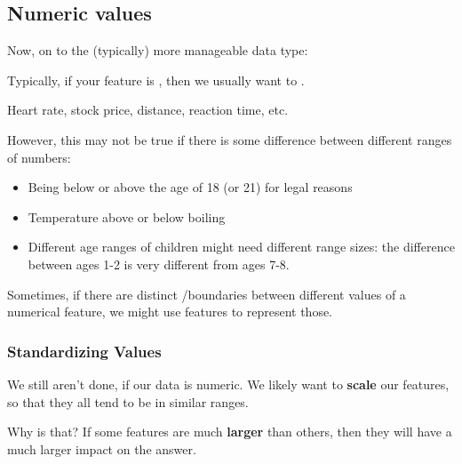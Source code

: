         \subsection*{Numeric values}

            Now, on to the (typically) more manageable data type:\\

            \begin{concept}
                Typically, if your feature is , then we usually want to .
            \end{concept}

            \miniex Heart rate, stock price, distance, reaction time, etc.

            However, this may not be true if there is some difference between different ranges of numbers:

            \begin{itemize}
                \item Being below or above the age of 18 (or 21) for legal reasons
                \item Temperature above or below boiling
                \item Different age ranges of children might need different range sizes: the difference between ages 1-2 is very different from ages 7-8.\\
            \end{itemize}

            \begin{concept}
                Sometimes, if there are distinct /boundaries between different values of a numerical feature, we might use  features to represent those.
            \end{concept}

            \subsecdiv
            \subsubsection*{Standardizing Values}
    
                We still aren't done, if our data is numeric. We likely want to \textbf{scale} our features, so that they all tend to be in similar ranges.
    
                Why is that? If some features are much \textbf{larger} than others, then they will have a much larger impact on the answer.

